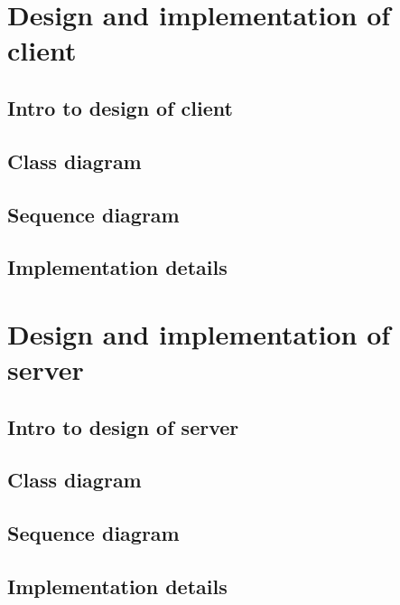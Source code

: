 
\section{Design and implementation of client}

\subsection{Intro to design of client}

\subsection{Class diagram}

\subsection{Sequence diagram}

\subsection{Implementation details}


\section{Design and implementation of server}

\subsection{Intro to design of server}

\subsection{Class diagram}

\subsection{Sequence diagram}

\subsection{Implementation details}